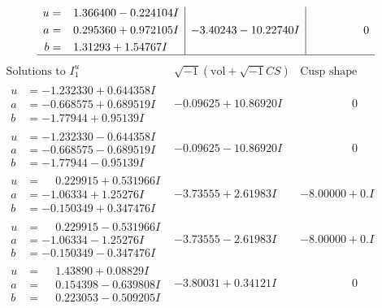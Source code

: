 \documentclass[1p]{elsarticle_modified}
\theoremstyle{definition}
\newcommand{\I}{\sqrt{-1}}
\begin{document}
$$\begin{array}{c|c|c}
\begin{aligned}
u &= \phantom{-}1.366400 - 0.224104 I \\
a &= \phantom{-}0.295360 + 0.972105 I \\
b &= \phantom{-}1.31293 + 1.54767 I\end{aligned}
 & -3.40243 - 10.22740 I & \phantom{-0.000000 } 0\\
 \hline 
 \end{array}$$\newpage$$\begin{array}{c|c|c}  
\text{Solutions to }I^u_{1}& \I (\text{vol} + \sqrt{-1}CS) & \text{Cusp shape}\\
 \hline 
\begin{aligned}
u &= -1.232330 + 0.644358 I \\
a &= -0.668575 + 0.689519 I \\
b &= -1.77944 + 0.95139 I\end{aligned}
 & -0.09625 + 10.86920 I & \phantom{-0.000000 } 0 \\ \hline\begin{aligned}
u &= -1.232330 - 0.644358 I \\
a &= -0.668575 - 0.689519 I \\
b &= -1.77944 - 0.95139 I\end{aligned}
 & -0.09625 - 10.86920 I & \phantom{-0.000000 } 0 \\ \hline\begin{aligned}
u &= \phantom{-}0.229915 + 0.531966 I \\
a &= -1.06334 + 1.25276 I \\
b &= -0.150349 + 0.347476 I\end{aligned}
 & -3.73555 + 2.61983 I & -8.00000 + 0. I\phantom{ +0.000000I} \\ \hline\begin{aligned}
u &= \phantom{-}0.229915 - 0.531966 I \\
a &= -1.06334 - 1.25276 I \\
b &= -0.150349 - 0.347476 I\end{aligned}
 & -3.73555 - 2.61983 I & -8.00000 + 0. I\phantom{ +0.000000I} \\ \hline\begin{aligned}
u &= \phantom{-}1.43890 + 0.08829 I \\
a &= \phantom{-}0.154398 - 0.639808 I \\
b &= \phantom{-}0.223053 - 0.509205 I\end{aligned}
 & -3.80031 + 0.34121 I & \phantom{-0.000000 } 0 \\ \hline\begin{aligned}

\end{aligned}
\end{array}$$
\end{document}
